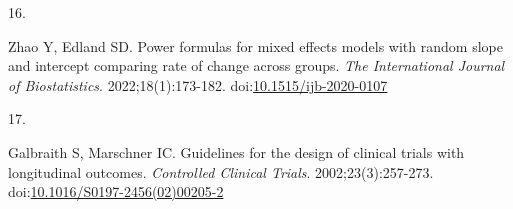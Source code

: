 \documentclass[
  11pt,
]{article}
\newlength{\cslhangindent}
\newlength{\csllabelwidth}
\newenvironment{CSLReferences}[2] %
 {\begin{list}{}{%
  \setlength{\itemindent}{0pt}
  \setlength{\leftmargin}{0pt}
  \setlength{\parsep}{0pt}
  \ifodd #1
   \setlength{\leftmargin}{\cslhangindent}
   \setlength{\itemindent}{-1\cslhangindent}
  \fi
  \setlength{\itemsep}{#2\baselineskip}}}
 {\end{list}}
\newcommand{\CSLLeftMargin}[1]{\parbox[t]{\csllabelwidth}{\strut#1\strut}}
\newcommand{\CSLRightInline}[1]{\parbox[t]{\linewidth - \csllabelwidth}{\strut#1\strut}}
\begin{document}
\begin{CSLReferences}{0}{1}
\CSLLeftMargin{16. }%
\CSLRightInline{Zhao Y, Edland SD. Power formulas for mixed effects models with random slope and intercept comparing rate of change across groups. \emph{The International Journal of Biostatistics}. 2022;18(1):173-182. doi:\href{https://doi.org/10.1515/ijb-2020-0107}{10.1515/ijb-2020-0107}}

\CSLLeftMargin{17. }%
\CSLRightInline{Galbraith S, Marschner IC. Guidelines for the design of clinical trials with longitudinal outcomes. \emph{Controlled Clinical Trials}. 2002;23(3):257-273. doi:\href{https://doi.org/10.1016/S0197-2456(02)00205-2}{10.1016/S0197-2456(02)00205-2}}

\end{CSLReferences}
\end{document}
